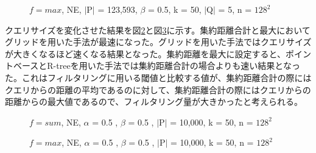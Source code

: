 \documentclass{deimj}
\begin{document}
\begin{figure}[H]
	\centering
    \caption{$f=max$, NE, $\mid$P$\mid$ = 123,593, $\beta$ = 0.5,  k = 50, $\mid$Q$\mid$ = 5, n = $128^2$}
    \label{fig:max-alpha}
\end{figure}

クエリサイズを変化させた結果を図\ref{fig:sum-querySize}と図\ref{fig:max-querySize}に示す。集約距離合計と最大においてグリッドを用いた手法が最速になった。グリッドを用いた手法ではクエリサイズが大きくなるほど速くなる結果となった。集約距離を最大に設定すると、ポイントベースとR-treeを用いた手法では集約距離合計の場合よりも速い結果となった。これはフィルタリングに用いる閾値と比較する値が、集約距離合計の際にはクエリからの距離の平均であるのに対して、集約距離合計の際にはクエリからの距離からの最大値であるので、フィルタリング量が大きかったと考えられる。

\begin{figure}[H]
	\centering
    \caption{$f=sum$, NE, $\alpha$ = 0.5 , $\beta$ = 0.5 , $\mid$P$\mid$ = 10,000, k = 50, n = $128^2$}
    \label{fig:sum-querySize}
\end{figure}

\begin{figure}[H]
	\centering
    \caption{$f=max$, NE, $\alpha$ = 0.5 , $\beta$ = 0.5 , $\mid$P$\mid$ = 10,000, k = 50, n = $128^2$}
    \label{fig:max-querySize}
\end{figure}
\end{document}
